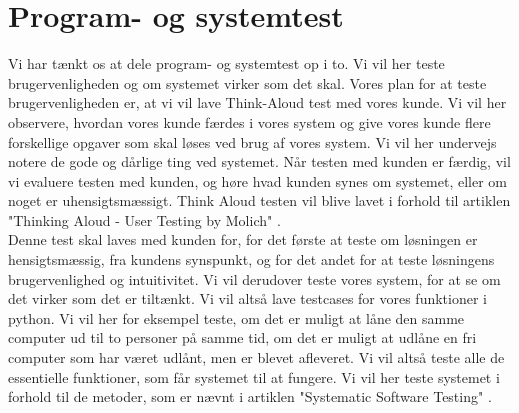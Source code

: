 \documentclass[a4paper]{article}
\begin{document}
\section{Program- og systemtest}
Vi har tænkt os at dele program- og systemtest op i to. Vi vil her teste brugervenligheden og om systemet virker som det skal. Vores plan for at teste brugervenligheden er, at vi vil lave Think-Aloud test med vores kunde. Vi vil her observere, hvordan vores kunde færdes i vores system og give vores kunde flere forskellige opgaver som skal løses ved brug af vores system. Vi vil her undervejs notere de gode og dårlige ting ved systemet. Når testen med kunden er færdig, vil vi evaluere testen med kunden, og høre hvad kunden synes om systemet, eller om noget er uhensigtsmæssigt. Think Aloud testen vil blive lavet i forhold til artiklen "Thinking Aloud - User Testing by Molich" \cite{ThinkAloud}. \\[0.1in]
Denne test skal laves med kunden for, for det første at teste om løsningen er hensigtsmæssig, fra kundens synspunkt, og for det andet for at teste løsningens brugervenlighed og intuitivitet. 
Vi vil derudover teste vores system, for at se om det virker som det er tiltænkt. Vi vil altså lave testcases for vores funktioner i python. Vi vil her for eksempel teste, om det er muligt at låne den samme computer ud til to personer på samme tid, om det er muligt at udlåne en fri computer som har været udlånt, men er blevet afleveret. Vi vil altså teste alle de essentielle funktioner, som får systemet til at fungere. Vi vil her teste systemet i forhold til de metoder, som er nævnt i artiklen "Systematic Software Testing" \cite{SoftwareTest}.
\end{document}
